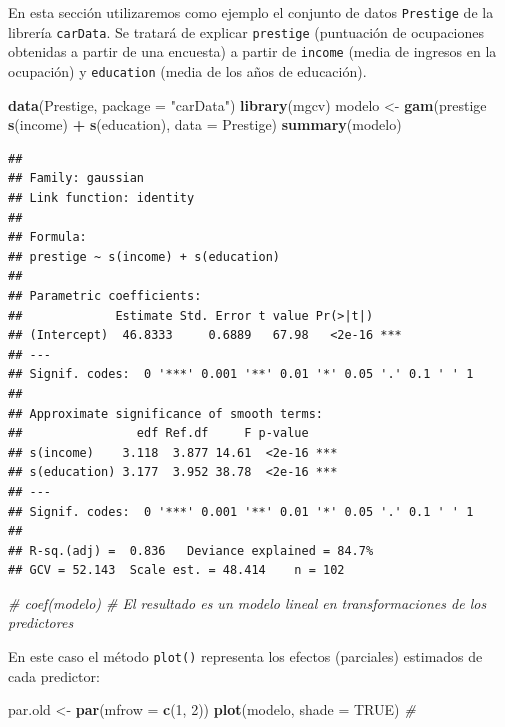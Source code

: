 \documentclass[
]{book}
\newenvironment{Shaded}{\begin{snugshade}}{\end{snugshade}}
\newcommand{\CommentTok}[1]{\textcolor[rgb]{0.56,0.35,0.01}{\textit{#1}}}
\newcommand{\DataTypeTok}[1]{\textcolor[rgb]{0.13,0.29,0.53}{#1}}
\newcommand{\DecValTok}[1]{\textcolor[rgb]{0.00,0.00,0.81}{#1}}
\newcommand{\KeywordTok}[1]{\textcolor[rgb]{0.13,0.29,0.53}{\textbf{#1}}}
\newcommand{\NormalTok}[1]{#1}
\newcommand{\OperatorTok}[1]{\textcolor[rgb]{0.81,0.36,0.00}{\textbf{#1}}}
\newcommand{\OtherTok}[1]{\textcolor[rgb]{0.56,0.35,0.01}{#1}}
\newcommand{\StringTok}[1]{\textcolor[rgb]{0.31,0.60,0.02}{#1}}
\theoremstyle{break}
\theoremstyle{definition}
\theoremstyle{definition}
\theoremstyle{definition}
\theoremstyle{remark}
\begin{document}
En esta sección utilizaremos como ejemplo el conjunto de datos \texttt{Prestige} de la librería \texttt{carData}.
Se tratará de explicar \texttt{prestige} (puntuación de ocupaciones obtenidas a partir de una encuesta) a partir de \texttt{income} (media de ingresos en la ocupación) y \texttt{education} (media de los años de educación).

\begin{Shaded}
\begin{Highlighting}[]
\KeywordTok{data}\NormalTok{(Prestige, }\DataTypeTok{package =} \StringTok{"carData"}\NormalTok{)}
\KeywordTok{library}\NormalTok{(mgcv)}
\NormalTok{modelo <-}\StringTok{ }\KeywordTok{gam}\NormalTok{(prestige }\OperatorTok{~}\StringTok{ }\KeywordTok{s}\NormalTok{(income) }\OperatorTok{+}\StringTok{ }\KeywordTok{s}\NormalTok{(education), }\DataTypeTok{data =}\NormalTok{ Prestige)}
\KeywordTok{summary}\NormalTok{(modelo)}
\end{Highlighting}
\end{Shaded}

\begin{verbatim}
## 
## Family: gaussian 
## Link function: identity 
## 
## Formula:
## prestige ~ s(income) + s(education)
## 
## Parametric coefficients:
##             Estimate Std. Error t value Pr(>|t|)    
## (Intercept)  46.8333     0.6889   67.98   <2e-16 ***
## ---
## Signif. codes:  0 '***' 0.001 '**' 0.01 '*' 0.05 '.' 0.1 ' ' 1
## 
## Approximate significance of smooth terms:
##                edf Ref.df     F p-value    
## s(income)    3.118  3.877 14.61  <2e-16 ***
## s(education) 3.177  3.952 38.78  <2e-16 ***
## ---
## Signif. codes:  0 '***' 0.001 '**' 0.01 '*' 0.05 '.' 0.1 ' ' 1
## 
## R-sq.(adj) =  0.836   Deviance explained = 84.7%
## GCV = 52.143  Scale est. = 48.414    n = 102
\end{verbatim}

\begin{Shaded}
\begin{Highlighting}[]
\CommentTok{# coef(modelo) # El resultado es un modelo lineal en transformaciones de los predictores}
\end{Highlighting}
\end{Shaded}

En este caso el método \texttt{plot()} representa los efectos (parciales) estimados de cada predictor:

\begin{Shaded}
\begin{Highlighting}[]
\NormalTok{par.old <-}\StringTok{ }\KeywordTok{par}\NormalTok{(}\DataTypeTok{mfrow =} \KeywordTok{c}\NormalTok{(}\DecValTok{1}\NormalTok{, }\DecValTok{2}\NormalTok{))}
\KeywordTok{plot}\NormalTok{(modelo, }\DataTypeTok{shade =} \OtherTok{TRUE}\NormalTok{) }\CommentTok{# }
\end{Highlighting}
\end{Shaded}
\end{document}
